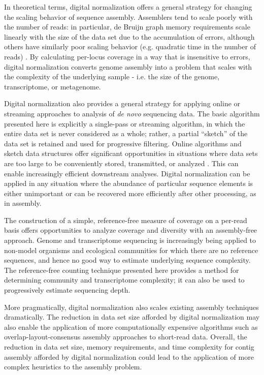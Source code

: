 \documentclass{pnastwo}
\begin{document}
\begin{article}
In theoretical terms, digital normalization offers a general strategy
for changing the scaling behavior of sequence assembly.  Assemblers
tend to scale poorly with the number of reads: in particular, de
Bruijn graph memory requirements scale linearly with the size of the
data set due to the accumulation of errors, although others have
similarly poor scaling behavior (e.g. quadratic time in the number of
reads) \cite{pubmed20211242}.  By calculating per-locus coverage in a way that
is insensitive to errors, digital normalization converts
genome assembly into a problem that scales with the complexity of the
underlying sample - i.e. the size of the genome, transcriptome, or
metagenome.

Digital normalization also provides a general strategy for applying
online or streaming approaches to analysis of {\em de novo} sequencing
data.  The basic algorithm presented here is explicitly a single-pass or streaming
algorithm, in which the entire data set is never considered as a
whole; rather, a partial ``sketch'' of the data set is retained and
used for progressive filtering.  Online algorithms and sketch data
structures offer significant opportunities in situations where data
sets are too large to be conveniently stored, transmitted, or analyzed
\cite{muthukrishnan2005data}.  This can enable increasingly efficient
downstream analyses.
Digital normalization can be applied in any situation where the
abundance of particular sequence elements is either unimportant or can be
recovered more efficiently after other processing, as in assembly.

The construction of a simple, reference-free measure of coverage on a
per-read basis offers opportunities to analyze coverage and
diversity with an assembly-free approach.  Genome and transcriptome
sequencing is increasingly being applied to non-model organisms and
ecological communities for which there are no reference sequences, and
hence no good way to estimate underlying sequence complexity.  The
reference-free counting technique presented here provides a method for
determining community and transcriptome complexity;
it can also be used to progressively estimate sequencing depth.

More pragmatically, digital normalization also scales existing
assembly techniques dramatically.
The reduction in data set size afforded by
digital normalization may also enable the application of more
computationally expensive algorithms such as overlap-layout-consensus
assembly approaches to short-read data.  Overall, the reduction in
data set size, memory requirements, and time complexity for contig
assembly afforded by digital normalization could lead to the
application of more complex heuristics to the assembly problem.


\end{article}
\end{document}
